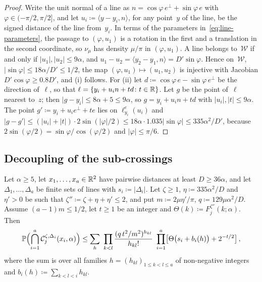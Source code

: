 \documentclass[11pt,letterpaper]{article}
\newcommand{\cW}{\mathcal W}
\newcommand{\cC}{\mathcal C}
\begin{document}
\begin{proof}
Write the unit normal of a line as $n=\cos\varphi\,e^\perp+\sin\varphi\,e$ with $\varphi\in(-\pi/2,\pi/2]$, and let $u_i\coloneqq\langle y-y_i,n\rangle$, for any point~$y$ of the line, be the signed distance of the line from~$y_i$. In terms of the parameters in~\eqref{eq:line-parameters}, the passage to $(\varphi,u_1)$ is a rotation in the first and a translation in the second coordinate, so $\nu_\mu$ has density $\mu/\pi$ in $(\varphi,u_1)$. A line belongs to~$\cW$ if and only if $\lvert u_1\rvert,\lvert u_2\rvert\le9\alpha$, and $u_1-u_2=\langle y_2-y_1,n\rangle=D'\sin\varphi$. Hence on~$\cW$, $\lvert\sin\varphi\rvert\le18\alpha/D'\le1/2$, the map $(\varphi,u_1)\mapsto(u_1,u_2)$ is injective with Jacobian $D'\cos\varphi\ge0.8D'$, and (i) follows. For (ii) let $d\coloneqq\cos\varphi\,e-\sin\varphi\,e^\perp$ be the direction of~$\ell$, so that $\ell=\{y_i+u_in+td\colon t\in\mathbb R\}$. Let $g$ be the point of~$\ell$ nearest to~$z$; then $\lvert g-y_i\rvert\le8\alpha+5\le9\alpha$, so $g=y_i+u_in+td$ with $\lvert u_i\rvert,\lvert t\rvert\le9\alpha$. The point $g'\coloneqq y_i+u_ie^\perp+te$ lies on $\ell^e_{y_i}(u_i)$ and $\lvert g-g'\rvert\le(\lvert u_i\rvert+\lvert t\rvert)\cdot2\sin(\lvert\varphi\rvert/2)\le18\alpha\cdot1.035\lvert\sin\varphi\rvert\le335\alpha^2/D'$, because $2\sin(\varphi/2)=\sin\varphi/\cos(\varphi/2)$ and $\lvert\varphi\rvert\le\pi/6$.
\end{proof}

\subsection{Decoupling of the sub-crossings}
\label{sub:sec:decoupling}

\begin{proposition}[Decoupling]
\label{sub:prop:decoupling}
Let $\alpha\ge5$, let $x_1,\dots,x_a\in\mathbb R^2$ have pairwise distances at least $D\ge36\alpha$, and let $\Delta_1,\dots,\Delta_a$ be finite sets of lines with $s_i\coloneqq\lvert\Delta_i\rvert$. Let $\zeta\ge1$, $\eta\coloneqq335\alpha^2/D$ and $\eta'>0$ be such that $\zeta''\coloneqq \zeta+\eta+\eta'\le2$, and put $m\coloneqq2\mu\eta'/\pi$, $q\coloneqq129\mu\alpha^2/D$. Assume $(a-1)m\le1/2$, let $t\ge1$ be an integer and $\Theta(k)\coloneqq F_j^{\zeta''}(k;\alpha)$. Then
\begin{equation}
\label{sub:eq:decoupling}
  \P\Bigl(\bigcap_{i=1}^{a}\cC_j^{\zeta,\Delta_i}(x_i,\alpha)\Bigr)\le\sum_{h}\ \prod_{k<l}\frac{(q\,t^2/m^2)^{h_{kl}}}{h_{kl}!}\ \prod_{i=1}^{a}\bigl[\Theta\bigl(s_i+b_i(h)\bigr)+2^{-t/2}\bigr]\,,
\end{equation}
where the sum is over all families $h=(h_{kl})_{1\le k<l\le a}$ of non-negative integers and $b_i(h)\coloneqq\sum_{k<l<i}h_{kl}$.
\end{proposition}
\end{document}
